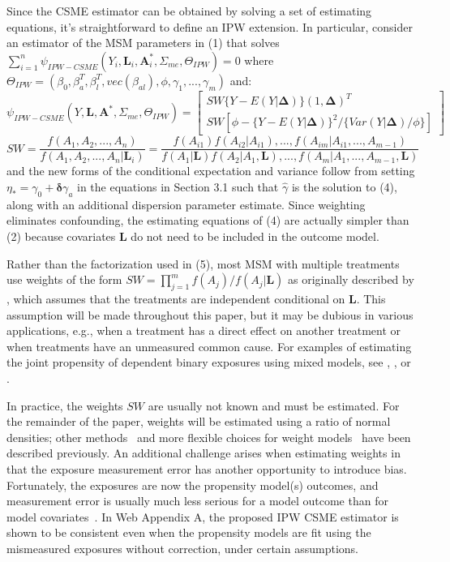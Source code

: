 \documentclass[useAMS,usenatbib,referee]{biom}
\begin{document}
Since the CSME estimator can be obtained by solving a set of estimating equations, it's straightforward to define an IPW extension. In particular, consider an estimator of the MSM parameters in (1) that solves $\sum_{i=1}^{n} \psi_{IPW-CSME}(Y_{i}, \bm{L}_{i}, \bm{A}^{*}_{i}, \Sigma_{me}, \Theta_{IPW}) = 0$ where $\Theta_{IPW} = (\beta_{0}, \beta^{T}_{a}, \beta^{T}_{l}, vec(\beta_{al}), \phi, \gamma_{1}, ..., \gamma_{m})$ and:
\begin{equation}
    \psi_{IPW-CSME}(Y, \bm{L}, \bm{A}^{*}, \Sigma_{me}, \Theta_{IPW}) =
    \begin{bmatrix}
       SW \{ Y - E(Y | \bm{\Delta}) \} (1, \bm{\Delta})^{T} \\
       SW \left [ \phi - \{ Y - E(Y | \bm{\Delta})\}^{2} / \{ Var(Y | \bm{\Delta}) / \phi \} \right ]
    \end{bmatrix}
\end{equation}
\begin{equation}
SW = \frac{f(A_{1}, A_{2}, ..., A_{n})}{f(A_{1}, A_{2}, ..., A_{n} | \bm{L}_{i})} = \frac{f(A_{i1})f(A_{i2} | A_{i1}), ..., f(A_{im} | A_{i1}, ..., A_{m-1})}{f(A_{1} | \bm{L})f(A_{2} | A_{1}, \bm{L}), ..., f(A_{m} | A_{1}, ..., A_{m-1}, \bm{L})}
\end{equation}
and the new forms of the conditional expectation and variance follow from setting $\eta_{*} = \gamma_{0} + \bm{\delta}\gamma_{a}$ in the equations in Section 3.1 such that $\hat{\gamma}$ is the solution to (4), along with an additional dispersion parameter estimate. Since weighting eliminates confounding, the estimating equations of (4) are actually simpler than (2) because covariates $\bm{L}$ do not need to be included in the outcome model.

Rather than the factorization used in (5), most MSM with multiple treatments use weights of the form $SW = \prod_{j=1}^{m} f(A_{j}) / f(A_{j} | \bm{L})$ as originally described by \citet{hernan2001}, which assumes that the treatments are independent conditional on $\bm{L}$. This assumption will be made throughout this paper, but it may be dubious in various applications, e.g., when a treatment has a direct effect on another treatment or when treatments have an unmeasured common cause. For examples of estimating the joint propensity of dependent binary exposures using mixed models, see \citet{tchetgen2012}, \citet{perez2014}, or \citet*{liu2016}.

In practice, the weights $SW$ are usually not known and must be estimated. For the remainder of the paper, weights will be estimated using a ratio of normal densities; other methods~\citep{hirano2004} and more flexible choices for weight models~\citep{naimi2014} have been described previously. An additional challenge arises when estimating weights in that the exposure measurement error has another opportunity to introduce bias. Fortunately, the exposures are now the propensity model(s) outcomes, and measurement error is usually much less serious for a model outcome than for model covariates~\citep{carroll2006}. In Web Appendix A, the proposed IPW CSME estimator is shown to be consistent even when the propensity models are fit using the mismeasured exposures without correction, under certain assumptions.
\end{document}
